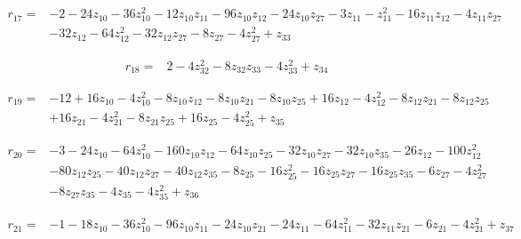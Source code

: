 \par\noindent\begin{minipage}{\linewidth}
\begin{align*}
r_{17}={}&-2-24z_{10}-36z_{10}^{2}-12z_{10}z_{11}-96z_{10}z_{12}-24z_{10}z_{27}-3z_{11}-z_{11}^{2}-16z_{11}z_{12}-4z_{11}z_{27}\\[-2pt]
&-32z_{12}-64z_{12}^{2}-32z_{12}z_{27}-8z_{27}-4z_{27}^{2}+z_{33}
\end{align*}
\end{minipage}\par
\par\noindent\begin{minipage}{\linewidth}
\begin{align*}
r_{18}={}&2-4z_{32}^{2}-8z_{32}z_{33}-4z_{33}^{2}+z_{34}
\end{align*}
\end{minipage}\par
\par\noindent\begin{minipage}{\linewidth}
\begin{align*}
r_{19}={}&-12+16z_{10}-4z_{10}^{2}-8z_{10}z_{12}-8z_{10}z_{21}-8z_{10}z_{25}+16z_{12}-4z_{12}^{2}-8z_{12}z_{21}-8z_{12}z_{25}\\[-2pt]
&+16z_{21}-4z_{21}^{2}-8z_{21}z_{25}+16z_{25}-4z_{25}^{2}+z_{35}
\end{align*}
\end{minipage}\par
\par\noindent\begin{minipage}{\linewidth}
\begin{align*}
r_{20}={}&-3-24z_{10}-64z_{10}^{2}-160z_{10}z_{12}-64z_{10}z_{25}-32z_{10}z_{27}-32z_{10}z_{35}-26z_{12}-100z_{12}^{2}\\[-2pt]
&-80z_{12}z_{25}-40z_{12}z_{27}-40z_{12}z_{35}-8z_{25}-16z_{25}^{2}-16z_{25}z_{27}-16z_{25}z_{35}-6z_{27}-4z_{27}^{2}\\[-2pt]
&-8z_{27}z_{35}-4z_{35}-4z_{35}^{2}+z_{36}
\end{align*}
\end{minipage}\par
\par\noindent\begin{minipage}{\linewidth}
\begin{align*}
r_{21}={}&-1-18z_{10}-36z_{10}^{2}-96z_{10}z_{11}-24z_{10}z_{21}-24z_{11}-64z_{11}^{2}-32z_{11}z_{21}-6z_{21}-4z_{21}^{2}+z_{37}
\end{align*}
\end{minipage}\par
